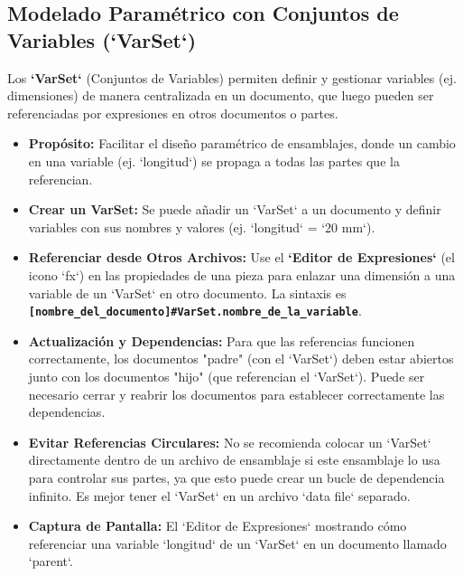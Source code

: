 \documentclass[12pt]{article}
\begin{document}
\subsection{Modelado Paramétrico con Conjuntos de Variables (`VarSet`)}
Los \textbf{`VarSet`} (Conjuntos de Variables) permiten definir y gestionar variables (ej. dimensiones) de manera centralizada en un documento, que luego pueden ser referenciadas por expresiones en otros documentos o partes.
\begin{itemize}[label=\textbullet]
    \item \textbf{Propósito:} Facilitar el diseño paramétrico de ensamblajes, donde un cambio en una variable (ej. `longitud`) se propaga a todas las partes que la referencian.
    \item \textbf{Crear un VarSet:} Se puede añadir un `VarSet` a un documento y definir variables con sus nombres y valores (ej. `longitud` = `20 mm`).
    \item \textbf{Referenciar desde Otros Archivos:} Use el \textbf{`Editor de Expresiones`} (el icono `fx`) en las propiedades de una pieza para enlazar una dimensión a una variable de un `VarSet` en otro documento. La sintaxis es \textbf{\texttt{[nombre\_del\_documento]\#VarSet.nombre\_de\_la\_variable}}.
    \item \textbf{Actualización y Dependencias:} Para que las referencias funcionen correctamente, los documentos "padre" (con el `VarSet`) deben estar abiertos junto con los documentos "hijo" (que referencian el `VarSet`). Puede ser necesario cerrar y reabrir los documentos para establecer correctamente las dependencias.
    \item \textbf{Evitar Referencias Circulares:} No se recomienda colocar un `VarSet` directamente dentro de un archivo de ensamblaje si este ensamblaje lo usa para controlar sus partes, ya que esto puede crear un bucle de dependencia infinito. Es mejor tener el `VarSet` en un archivo `data file` separado.
    \item \textbf{Captura de Pantalla:} El `Editor de Expresiones` mostrando cómo referenciar una variable `longitud` de un `VarSet` en un documento llamado `parent`.
\end{itemize}
\end{document}
